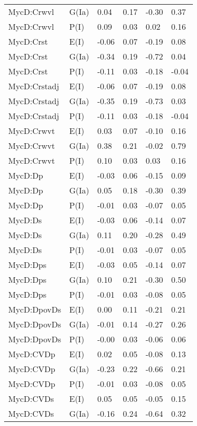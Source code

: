 \begin{center}
\begin{longtable}{|p{1.1in}|p{0.7in}|p{0.7in}|p{0.6in}|p{0.6in}|p{0.6in}|}
  MycD:Crwvl & G(Ia) & 0.04 & 0.17 & -0.30 & 0.37 \\ 
  MycD:Crwvl & P(I) & 0.09 & 0.03 & 0.02 & 0.16 \\ 
  MycD:Crst & E(I) & -0.06 & 0.07 & -0.19 & 0.08 \\ 
  MycD:Crst & G(Ia) & -0.34 & 0.19 & -0.72 & 0.04 \\ 
  MycD:Crst & P(I) & -0.11 & 0.03 & -0.18 & -0.04 \\ 
  MycD:Crstadj & E(I) & -0.06 & 0.07 & -0.19 & 0.08 \\ 
  MycD:Crstadj & G(Ia) & -0.35 & 0.19 & -0.73 & 0.03 \\ 
  MycD:Crstadj & P(I) & -0.11 & 0.03 & -0.18 & -0.04 \\ 
  MycD:Crwvt & E(I) & 0.03 & 0.07 & -0.10 & 0.16 \\ 
  MycD:Crwvt & G(Ia) & 0.38 & 0.21 & -0.02 & 0.79 \\ 
  MycD:Crwvt & P(I) & 0.10 & 0.03 & 0.03 & 0.16 \\ 
  MycD:Dp & E(I) & -0.03 & 0.06 & -0.15 & 0.09 \\ 
  MycD:Dp & G(Ia) & 0.05 & 0.18 & -0.30 & 0.39 \\ 
  MycD:Dp & P(I) & -0.01 & 0.03 & -0.07 & 0.05 \\ 
  MycD:Ds & E(I) & -0.03 & 0.06 & -0.14 & 0.07 \\ 
  MycD:Ds & G(Ia) & 0.11 & 0.20 & -0.28 & 0.49 \\ 
  MycD:Ds & P(I) & -0.01 & 0.03 & -0.07 & 0.05 \\ 
  MycD:Dps & E(I) & -0.03 & 0.05 & -0.14 & 0.07 \\ 
  MycD:Dps & G(Ia) & 0.10 & 0.21 & -0.30 & 0.50 \\ 
  MycD:Dps & P(I) & -0.01 & 0.03 & -0.08 & 0.05 \\ 
  MycD:DpovDs & E(I) & 0.00 & 0.11 & -0.21 & 0.21 \\ 
  MycD:DpovDs & G(Ia) & -0.01 & 0.14 & -0.27 & 0.26 \\ 
  MycD:DpovDs & P(I) & -0.00 & 0.03 & -0.06 & 0.06 \\ 
  MycD:CVDp & E(I) & 0.02 & 0.05 & -0.08 & 0.13 \\ 
  MycD:CVDp & G(Ia) & -0.23 & 0.22 & -0.66 & 0.21 \\ 
  MycD:CVDp & P(I) & -0.01 & 0.03 & -0.08 & 0.05 \\ 
  MycD:CVDs & E(I) & 0.05 & 0.05 & -0.05 & 0.15 \\ 
  MycD:CVDs & G(Ia) & -0.16 & 0.24 & -0.64 & 0.32 \\ 

\end{longtable}
\end{center}
